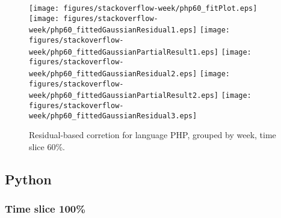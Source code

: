 \begin{figure}[t]
\centering
{}
{\texttt{[image: figures/stackoverflow-week/php60\_fitPlot.eps]}}
{\texttt{[image: figures/stackoverflow-week/php60\_fittedGaussianResidual1.eps]}}
{\texttt{[image: figures/stackoverflow-week/php60\_fittedGaussianPartialResult1.eps]}}
{\texttt{[image: figures/stackoverflow-week/php60\_fittedGaussianResidual2.eps]}}
{\texttt{[image: figures/stackoverflow-week/php60\_fittedGaussianPartialResult2.eps]}}
{\texttt{[image: figures/stackoverflow-week/php60\_fittedGaussianResidual3.eps]}}
\caption{Residual-based corretion for language PHP, grouped by week, time slice 60\%.}
\end{figure}


\FloatBarrier


\subsection{Python}

\subsubsection{Time slice 100\%}

